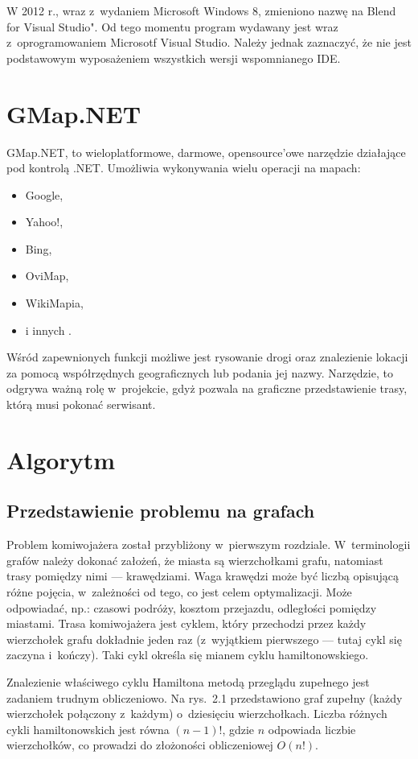 \documentclass[12pt,a4paper]{report}
\begin{document}
W 2012 r., wraz z~wydaniem Microsoft Windows 8, zmieniono nazwę na Blend for Visual Studio". Od tego momentu program wydawany jest wraz z~oprogramowaniem Microsotf Visual Studio. Należy jednak zaznaczyć, że nie jest podstawowym wyposażeniem wszystkich wersji wspomnianego IDE.

\section{GMap.NET}
GMap.NET, to wieloplatformowe, darmowe, opensource'owe narzędzie działające pod kontrolą .NET. Umożliwia wykonywania wielu operacji na mapach:

\begin{itemize}
  \item Google,
  \item Yahoo!,
  \item Bing,
  \item OviMap,
  \item WikiMapia,
  \item i innych \cite{GMap}.
\end{itemize}

Wśród zapewnionych funkcji możliwe jest rysowanie drogi oraz znalezienie lokacji za pomocą współrzędnych geograficznych lub podania jej nazwy. Narzędzie, to odgrywa ważną rolę w~projekcie, gdyż pozwala na graficzne przedstawienie trasy, którą musi pokonać serwisant.

\section{Algorytm}

\subsection{Przedstawienie problemu na grafach}
Problem komiwojażera został przybliżony w~pierwszym rozdziale. W~terminologii grafów należy dokonać założeń, że miasta są wierzchołkami grafu, natomiast trasy pomiędzy nimi --- krawędziami. Waga krawędzi może być liczbą opisującą różne pojęcia, w~zależności od tego, co jest celem optymalizacji. Może odpowiadać, np.: czasowi podróży, kosztom przejazdu, odległości pomiędzy miastami. Trasa komiwojażera jest cyklem, który przechodzi przez każdy wierzchołek grafu dokładnie jeden raz (z~wyjątkiem pierwszego --- tutaj cykl się zaczyna i~kończy). Taki cykl określa się mianem cyklu hamiltonowskiego. 

Znalezienie właściwego cyklu Hamiltona metodą przeglądu zupełnego jest zadaniem trudnym obliczeniowo. Na rys.~2.1 przedstawiono graf zupełny (każdy wierzchołek połączony z~każdym) o~dziesięciu wierzchołkach. Liczba różnych cykli hamiltonowskich jest równa $(n - 1)!$, gdzie $n$ odpowiada liczbie wierzchołków, co prowadzi do złożoności obliczeniowej $O(n!)$.
\end{document}
